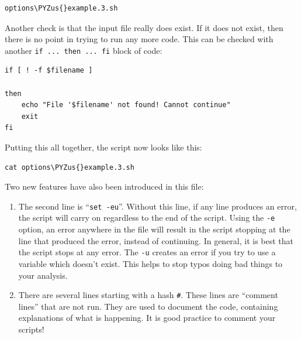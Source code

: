 \documentclass[11pt]{article}
\makeatletter
\providecommand{\tightlist}{%
      \setlength{\itemsep}{0pt}\setlength{\parskip}{0pt}}
\def\PYZus{\char`\_}
\newcommand{\boxspacing}{\kern\kvtcb@left@rule\kern\kvtcb@boxsep}
\newcommand{\prompt}[4]{
       \ttfamily\llap{{\color{#2}\LARGE\faKeyboardO\hspace{3pt}#4}}\vspace{-\baselineskip}
    }
\makeatother
\begin{document}
    \begin{tcolorbox}[breakable, size=fbox, boxrule=1pt, pad at break*=1mm,colback=cellbackground, colframe=cellborder]
\prompt{In}{incolor}{ }{\boxspacing}
\begin{Verbatim}[commandchars=\\\{\}]
options\PYZus{}example.3.sh
\end{Verbatim}
\end{tcolorbox}

    Another check is that the input file really does exist. If it does not
exist, then there is no point in trying to run any more code. This can
be checked with another \texttt{if\ ...\ then\ ...\ fi} block of code:

\begin{verbatim}
if [ ! -f $filename ]

then
    echo "File '$filename' not found! Cannot continue"
    exit
fi
\end{verbatim}

Putting this all together, the script now looks like this:

    \begin{tcolorbox}[breakable, size=fbox, boxrule=1pt, pad at break*=1mm,colback=cellbackground, colframe=cellborder]
\prompt{In}{incolor}{ }{\boxspacing}
\begin{Verbatim}[commandchars=\\\{\}]
cat options\PYZus{}example.3.sh
\end{Verbatim}
\end{tcolorbox}

    Two new features have also been introduced in this file:

\begin{enumerate}
\def\labelenumi{\arabic{enumi}.}
\tightlist
\item
  The second line is ``\texttt{set\ -eu}''. Without this line, if any
  line produces an error, the script will carry on regardless to the end
  of the script. Using the \texttt{-e} option, an error anywhere in the
  file will result in the script stopping at the line that produced the
  error, instead of continuing. In general, it is best that the script
  stops at any error. The \texttt{-u} creates an error if you try to use
  a variable which doesn't exist. This helps to stop typos doing bad
  things to your analysis.
\item
  There are several lines starting with a hash \texttt{\#}. These lines
  are ``comment lines'' that are not run. They are used to document the
  code, containing explanations of what is happening. It is good
  practice to comment your scripts!
\end{enumerate}
\end{document}
